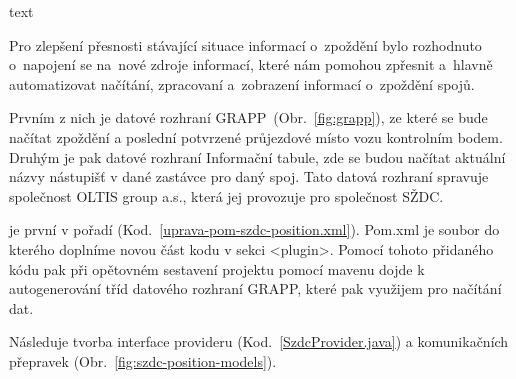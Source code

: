 text


Pro zlepšení přesnosti stávající situace informací o~zpoždění bylo rozhodnuto o~napojení se na~nové zdroje informací, které nám pomohou zpřesnit a~hlavně automatizovat načítání, zpracovaní a~zobrazení informací o~zpoždění spojů.

Prvním z nich je datové rozhraní GRAPP~(Obr.~\ref{fig:grapp}), ze které se bude načítat zpoždění a poslední potvrzené průjezdové místo vozu kontrolním bodem. Druhým je pak datové rozhraní Informační tabule, zde se budou načítat aktuální názvy nástupišť v dané zastávce pro daný spoj. Tato datová rozhraní spravuje společnost OLTIS group a.s., která jej provozuje pro společnost SŽDC.


je první v pořadí (Kod.~\ref{uprava-pom-szdc-position.xml}). Pom.xml je soubor do kterého doplníme novou část kodu v sekci <plugin>. Pomocí tohoto přidaného kódu pak při opětovném sestavení projektu pomocí mavenu dojde k autogenerování tříd datového rozhraní GRAPP, které pak využijem pro načítání dat.


Následuje tvorba interface provideru (Kod.~\ref{SzdcProvider.java}) a komunikačních přepravek (Obr.~\ref{fig:szdc-position-models}).
 	
